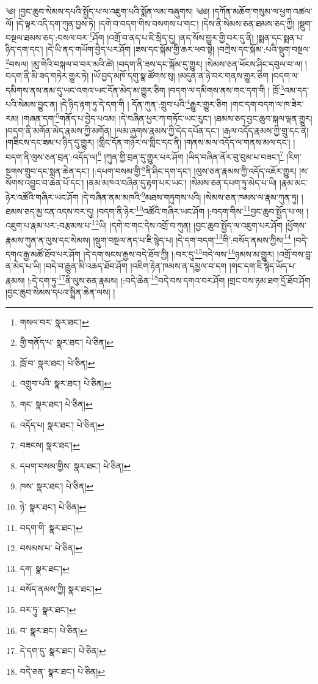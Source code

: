 \setcounter{footnote}{0} 
༄། །བྱང་ཆུབ་སེམས་དཔའི་སྤྱོད་པ་ལ་འཇུག་པའི་སྨོན་ལམ་བཞུགས། ༄༅། །དཀོན་མཆོག་གསུམ་ལ་ཕྱག་འཚལ་ལོ། །དེ་ལྟར་འདི་དག་ཀུན་བྱས་ཏེ། །དགེ་བ་བདག་གིས་བསགས་པ་གང་། །དེས་ནི་སེམས་ཅན་ཐམས་ཅད་ཀྱི། །སྡུག་བསྔལ་ཐམས་ཅད་:བསལ་བར་\footnote{གསལ་བར་  སྣར་ཐང་། }ཤོག །འགྲོ་བ་ནད་པ་ཇི་སྲིད་དུ། །ནད་སོས་གྱུར་གྱི་བར་དུ་ནི། །སྨན་དང་སྨན་པ་ཉིད་དག་དང་། །དེ་ཡི་ནད་གཡོག་བྱེད་པར་ཤོག །ཟས་དང་སྐོམ་གྱི་ཆར་ཕབ་སྟེ། །བཀྲེས་དང་སྐོམ་:པའི་སྡུག་བསྔལ་\footnote{གྱི་གནོད་པ་  སྣར་ཐང་།  པེ་ཅིན། }བསལ། །མུ་གེའི་བསྐལ་བ་བར་མའི་ཚེ། །བདག་ནི་ཟས་དང་སྐོམ་དུ་གྱུར། །སེམས་ཅན་ཕོངས་ཤིང་དབུལ་བ་ལ། །བདག་ནི་མི་ཟད་གཏེར་གྱུར་ཏེ། །ཡོ་བྱད་མཁོ་དགུ་སྣ་ཚོགས་སུ། །མདུན་ན་ཉེ་བར་གནས་གྱུར་ཅིག །བདག་ལ་དམིགས་ནས་ནམ་དུ་ཡང་འགའ་ཡང་དོན་མེད་མ་གྱུར་ཅིག །བདག་ལ་དམིགས་ནས་གང་དག་གི ། ཁྲོ་\footnote{ཁྲོ་བ་  སྣར་ཐང་།  པེ་ཅིན། }འམ་དད་པའི་སེམས་བྱུང་ན། །དེ་ཉིད་རྟག་ཏུ་དེ་དག་གི ། དོན་ཀུན་:གྲུབ་པའི་\footnote{འགྲུབ་པའི་  སྣར་ཐང་།  པེ་ཅིན། }རྒྱུར་གྱུར་ཅིག །གང་དག་བདག་ལ་ཁ་ཟེར་རམ། །གཞན་དག་\footnote{གང་  སྣར་ཐང་།  པེ་ཅིན། }གནོད་པ་བྱེད་པའམ། །དེ་བཞིན་ཕྱར་ཀ་གཏོང་ཡང་རུང་། །ཐམས་ཅད་བྱང་ཆུབ་སྐལ་ལྡན་གྱུར། །བདག་ནི་མགོན་མེད་རྣམས་ཀྱི་མགོན། །ལམ་ཞུགས་རྣམས་ཀྱི་དེད་དཔོན་དང་། །རྒལ་འདོད་རྣམས་ཀྱི་གྲུ་དང་ནི། །གཟིངས་དང་ཟམ་པ་ཉིད་དུ་གྱུར། །གླིང་དོན་གཉེར་ལ་གླིང་དང་ནི། །གནས་མལ་འདོད་ལ་གནས་མལ་དང་། །བདག་ནི་ལུས་ཅན་བྲན་:འདོད་ལ།\footnote{འདོད་པ།  སྣར་ཐང་།  པེ་ཅིན། } །ཀུན་གྱི་བྲན་དུ་གྱུར་པར་ཤོག །ཡིད་བཞིན་ནོར་བུ་བུམ་པ་བཟང་།\footnote{བཟངས།  སྣར་ཐང་། } །རིག་སྔགས་གྲུབ་དང་སྨན་ཆེན་དང་། །:དཔག་བསམ་གྱི་\footnote{དཔག་བསམ་གྱིས་  སྣར་ཐང་།  པེ་ཅིན། }ནི་ཤིང་དག་དང་། །ལུས་ཅན་རྣམས་ཀྱི་འདོད་འཇོར་གྱུར། །ས་སོགས་འབྱུང་བ་ཆེན་པོ་དང་། །ནམ་མཁའ་བཞིན་དུ་རྟག་པར་ཡང་། །སེམས་ཅན་དཔག་ཏུ་མེད་པ་ཡི། །རྣམ་མང་ཉེར་འཚོའི་གཞིར་ཡང་ཤོག །དེ་བཞིན་ནམ་མཁའི་\footnote{ཁས་  སྣར་ཐང་།  པེ་ཅིན། }མཐས་གཏུགས་པའི། །སེམས་ཅན་ཁམས་ལ་རྣམ་ཀུན་ཏུ། །ཐམས་ཅད་མྱ་ངན་འདས་བར་དུ། །བདག་ནི་ཉེར་\footnote{ཉེ་  སྣར་ཐང་།  པེ་ཅིན། }འཚོའི་གཞིར་ཡང་ཤོག །:བདག་གིས་\footnote{བདག་གི་  སྣར་ཐང་། }བྱང་ཆུབ་སྤྱོད་པ་ལ། །འཇུག་པ་རྣམ་པར་:བརྩམས་པ་\footnote{བསམས་པ་  པེ་ཅིན། }ཡི། །དགེ་བ་གང་དེས་འགྲོ་བ་ཀུན། །བྱང་ཆུབ་སྤྱོད་ལ་འཇུག་པར་ཤོག །ཕྱོགས་རྣམས་ཀུན་ན་ལུས་དང་སེམས། །སྡུག་བསྔལ་ནད་པ་ཇི་སྙེད་པ། །དེ་དག་བདག་\footnote{དག་  སྣར་ཐང་། }གི་:བསོད་ནམས་ཀྱིས།\footnote{བསོད་ནམས་ཀྱི།  སྣར་ཐང་། } །བདེ་དགའ་རྒྱ་མཚོ་ཐོབ་པར་ཤོག །དེ་དག་སངས་རྒྱས་བདེ་ཐོབ་ཀྱི། །:བར་དུ་\footnote{བར་ཏུ་  སྣར་ཐང་། }བདེ་ལས་\footnote{བ་  སྣར་ཐང་།  པེ་ཅིན། }ཉམས་མ་གྱུར། །འགྲོ་བས་བླ་ན་མེད་པ་ཡི། །བདེ་བ་རྒྱུན་མི་འཆད་ཐོབ་ཤོག །འཇིག་རྟེན་ཁམས་ན་དམྱལ་བ་དག །གང་དག་ཇི་སྙེད་ཡོད་པ་རྣམས། །:དེ་དག་ཏུ་\footnote{དེ་དག་དུ་  སྣར་ཐང་།  པེ་ཅིན། }ནི་ལུས་ཅན་རྣམས། །:བདེ་ཆེན་\footnote{བདེ་ཅན་  སྣར་ཐང་།  པེ་ཅིན། }བདེ་བས་དགའ་བར་ཤོག །གྲང་བས་ཉམ་ཐག་དྲོ་ཐོབ་ཤོག །བྱང་ཆུབ་སེམས་དཔའ་སྤྲིན་ཆེན་ལས། །
